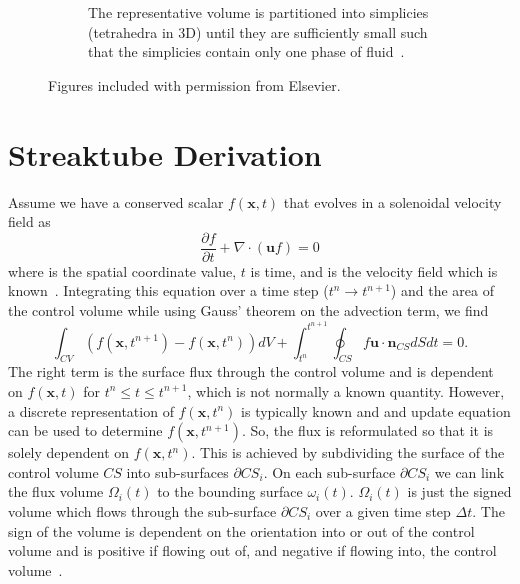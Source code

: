 \begin{figure}[htbp]
\begin{subfigure}{0.45\textwidth}
		\caption{The representative volume is partitioned into simplicies (tetrahedra in 3D) until they are sufficiently small such that the simplicies contain only one phase of fluid~\cite{Owkes2014}.}
		\label{fig:simp}
	\end{subfigure}
\caption{Figures included with permission from Elsevier.}
\end{figure}

\section{Streaktube Derivation}
Assume we have a conserved scalar $f(\bm{x},t)$ that evolves in a solenoidal velocity field as 
\begin{equation}
\frac{\partial f}{\partial t} + \nabla \cdot (\bm{u} f) = 0
\label{eqn:der1}
\end{equation}
where  is the spatial coordinate value, $t$ is time, and  is the velocity field which is known~\cite{Owkes2014}. Integrating this equation over a time step ($t^n \rightarrow t^{n+1}$) and the area of the control volume while using Gauss' theorem on the advection term, we find 
\begin{equation}
\int_{CV} (  f(\bm{x}, t^{n+1})  - f(\bm{x}, t^{n})  ) dV  + \int_{t^n}^{t^{n+1}} \oint_{CS} f \bm{u} \cdot \bm{n}_{CS} dS dt = 0.
\label{eqn:der2}
\end{equation}
The right term is the surface flux through the control volume and is dependent on $f( \bm{x}, t)$ for $t^n \leq t \leq t^{n+1}$, which is not normally a known quantity. However, a discrete representation of $f( \bm{x}, t^{n})$ is typically known and and update equation can be used to determine $f( \bm{x}, t^{n+1})$. So, the flux is reformulated so that it is solely dependent on $f( \bm{x}, t^{n})$. This is achieved by subdividing the surface of the control volume $CS$ into sub-surfaces $\partial{CS_i}$. On each sub-surface $\partial CS_i$ we can link the flux volume $\Omega_i(t)$ to the bounding surface $\omega_i(t)$. $\Omega_i(t)$ is just the signed volume which flows through the sub-surface $\partial CS_i$ over a given time step $\Delta t$.  The sign of the volume is dependent on the orientation into or out of the control volume and is positive if flowing out of, and negative if flowing into, the control volume~\cite{Owkes2017}. 

